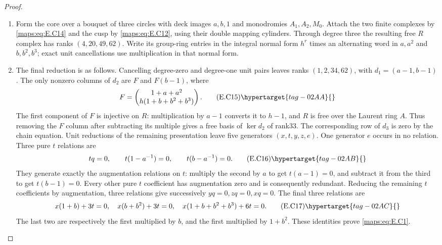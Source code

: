 \begin{proof}
\begin{enumerate}[label={$\langle1\rangle$\arabic*.},leftmargin=*]
\item Form the core over a bouquet of three circles with
deck images $a,b,1$ and monodromies $A_1,A_2,M_0$.
Attach the two finite complexes by \eqref{maps:eq:E.C14} and the
cusp by \eqref{maps:eq:E.C12}, using their double mapping cylinders.
Through degree three the resulting free $R$ complex
has ranks $(4,20,49,62)$. Write its group-ring entries in the integral normal form $h^r$ times
an alternating word in $a,a^2$ and $b,b^2,b^3$; exact unit
cancellations use multiplication in that normal form.

\item The final reduction is as follows. Cancelling degree-zero
and degree-one unit pairs leaves ranks $(1,2,34,62)$,
with $d_1=(a-1,b-1)$. The only nonzero columns of
$d_2$ are $F$ and $F(b-1)$, where
\[
 F=\begin{pmatrix}1+a+a^2\\h(1+b+b^2+b^3)\end{pmatrix}.
 \tag{E.C15}\hypertarget{tag-02AA}{}\label{maps:eq:E.C15}
\]
The first component of $F$ is injective on $R$:
multiplication by $a-1$ converts it to $h-1$, and
$R$ is free over the Laurent ring $A$. Thus removing
the $F$ column after subtracting its multiple gives
a free basis of $\ker d_2$ of rank33. The corresponding
row of $d_3$ is zero by the chain equation. Unit
reductions of the remaining presentation leave five
generators $(x,t,y,z,e)$. One generator $e$ occurs
in no relation. Three pure $t$ relations are
\[
 tq=0,\qquad t(1-a^{-1})=0,
                  \qquad t(b-a^{-1})=0.
 \tag{E.C16}\hypertarget{tag-02AB}{}\label{maps:eq:E.C16}
\]
They generate exactly the augmentation relations on
$t$: multiply the second by $a$ to get $t(a-1)=0$,
and subtract it from the third to get $t(b-1)=0$.
Every other pure $t$ coefficient has augmentation
zero and is consequently redundant. Reducing the
remaining $t$ coefficients by augmentation, three
relations give successively $yq=0,zq=0,xq=0$.
The final three relations are
\[
 x(1+b)+3t=0,\quad x(b+b^2)+3t=0,
                   \quad x(1+b+b^2+b^3)+6t=0.
 \tag{E.C17}\hypertarget{tag-02AC}{}\label{maps:eq:E.C17}
\]
The last two are respectively the first multiplied
by $b$, and the first multiplied by $1+b^2$.
These identities prove \eqref{maps:eq:E.C1}.


\end{enumerate}
\end{proof}
